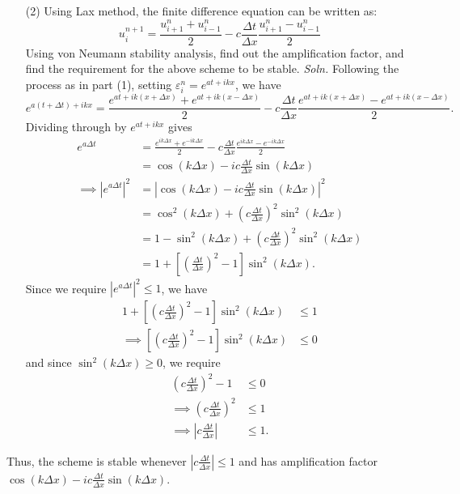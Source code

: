 \documentclass{article}
\begin{document}
\begin{itemize}
\begin{itemize}
        \item[(2)] Using Lax method, the finite difference equation can be written as:
        \[u_i^{n + 1} = \frac{u_{i+1}^n + u_{i - 1}^n}{2} - c\frac{\Delta t}{\Delta x}\frac{u_{i+1}^n - u_{i-1}^n}{2}\]
        Using von Neumann stability analysis, find out the amplification factor, and find the requirement for the above scheme to be stable.
        \newline\newline
        \textit{Soln.} Following the process as in part (1), setting $\varepsilon_i^n = e^{at + ikx}$, we have
        \[e^{a(t + \Delta t) + ikx} = \frac{e^{at + ik(x + \Delta x)} + e^{at + ik(x - \Delta x)}}{2} - c\frac{\Delta t}{\Delta x}\frac{e^{at + ik(x + \Delta x)} - e^{at + ik(x - \Delta x)}}{2}.\]
        Dividing through by $e^{at + ikx}$ gives
        \begin{align*}
            e^{a\Delta t} &= \frac{e^{ik\Delta x} + e^{-ik\Delta x}}{2} - c\frac{\Delta t}{\Delta x}\frac{e^{ik\Delta x} - e^{-ik\Delta x}}{2}\\
            &= \cos(k\Delta x) - ic\frac{\Delta t}{\Delta x}\sin(k\Delta x)\\
            \implies \left|e^{a\Delta t}\right|^2 &= \left|\cos(k\Delta x) - ic\frac{\Delta t}{\Delta x}\sin(k\Delta x)\right|^2\\
            &= \cos^2(k\Delta x) + \left(c\frac{\Delta t}{\Delta x}\right)^2\sin^2(k\Delta x)\\
            &= 1 - \sin^2(k \Delta x) + \left(c\frac{\Delta t}{\Delta x}\right)^2\sin^2(k\Delta x)\\
            &= 1 + \left[\left(\frac{\Delta t}{\Delta x}\right)^2 - 1\right]\sin^2(k\Delta x).
        \end{align*}
        Since we require $\left|e^{a\Delta t}\right|^2 \leq 1$, we have 
        \begin{align*}
            1 + \left[\left(c\frac{\Delta t}{\Delta x}\right)^2 - 1\right]\sin^2(k\Delta x) &\leq 1\\
            \implies \left[\left(c\frac{\Delta t}{\Delta x}\right)^2 - 1\right]\sin^2(k\Delta x) &\leq 0
        \end{align*}
        and since $\sin^2(k\Delta x) \geq 0$, we require 
        \begin{align*}
            \left(c\frac{\Delta t}{\Delta x}\right)^2 - 1 &\leq 0\\
            \implies \left(c\frac{\Delta t}{\Delta x}\right)^2 &\leq 1\\
            \implies \left|c\frac{\Delta t}{\Delta x}\right| &\leq 1.
        \end{align*}
    \end{itemize}
    Thus, the scheme is stable whenever $\left|c\frac{\Delta t}{\Delta x}\right| \leq 1$ and has amplification factor $\cos(k\Delta x) - ic\frac{\Delta t}{\Delta x}\sin(k\Delta x)$.


\end{itemize}
\end{document}
